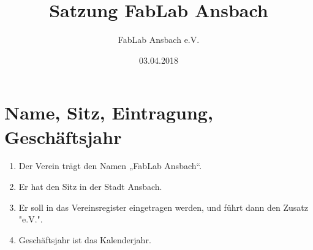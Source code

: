 \title{Satzung FabLab Ansbach}
\author{FabLab Ansbach e.V.}
\date{03.04.2018}


\usepackage{enumitem}


\makeatletter
\def\@seccntformat#1{\@ifundefined{#1@cntformat}%
   {\csname the#1\endcsname\quad}%
   {\csname #1@cntformat\endcsname}}%
\newcommand\section@cntformat{\S\thesection\quad}   %
\makeatother


\maketitle

\section{Name, Sitz, Eintragung, Geschäftsjahr}
\begin{enumerate}
  \item Der Verein trägt den Namen „FabLab Ansbach“.
  \item Er hat den Sitz in der Stadt Ansbach.
  \item Er soll in das Vereinsregister eingetragen werden, und führt dann den Zusatz "e.V.".
  \item Geschäftsjahr ist das Kalenderjahr.
\end{enumerate}


